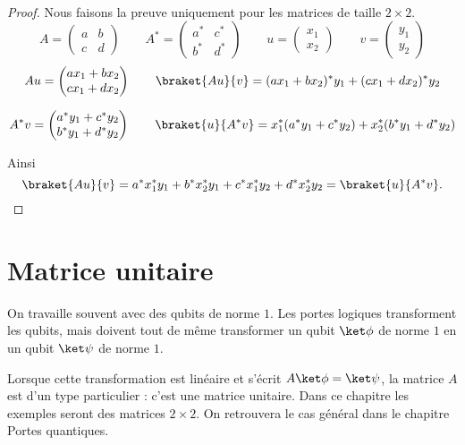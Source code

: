 \documentclass[11pt,class=report,crop=false]{standalone}
\begin{document}

\begin{proposition}
~
\end{proposition}

\begin{proof}
Nous faisons la preuve uniquement pour les matrices de taille $2\times 2$.
$$A = \begin{pmatrix}a&b\\c&d\end{pmatrix}
\qquad A^* = \begin{pmatrix}a^*&c^*\\b^*&d^*\end{pmatrix}
\qquad u = \begin{pmatrix}x_1\\x_2\end{pmatrix}
\qquad v = \begin{pmatrix}y_1\\y_2\end{pmatrix}
$$
$$Au = \begin{pmatrix}
ax_1+bx_2\\
cx_1+dx_2 \\
\end{pmatrix}
\qquad 
\braket{Au}{v} = (ax_1+bx_2)^*y_1 + (cx_1+dx_2)^*y_2$$

$$A^* v = \begin{pmatrix}
a^*y_1+c^*y_2\\
b^*y_1+d^*y_2 \\
\end{pmatrix}
\qquad 
\braket{u}{A^*v} = x_1^*(a^*y_1+c^*y_2) + x_2^*(b^*y_1+d^*y_2)$$

Ainsi 
$$\braket{Au}{v} = a^*x_1^*y_1 +b^*x_2^*y_1 + c^*x_1^*y_2+d^*x_2^*y_2
= \braket{u}{A^*v}.$$
\end{proof}




\section{Matrice unitaire}

On travaille souvent avec des qubits de norme $1$.
Les portes logiques transforment les qubits, mais doivent tout de même transformer un qubit $\ket\phi$ de norme $1$ en un qubit $\ket\psi$ de norme $1$.

Lorsque cette transformation est linéaire et s'écrit $A\ket\phi =\ket\psi$, la matrice $A$ est d'un type particulier : c'est une matrice unitaire. Dans ce chapitre les exemples seront des matrices $2\times 2$. On retrouvera le cas général dans le chapitre \og{}Portes quantiques\fg{}.
\end{document}
